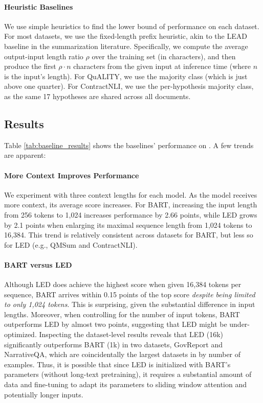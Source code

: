 \paragraph{Heuristic Baselines} We use simple heuristics to find the lower bound of performance on each dataset. For most datasets, we use the fixed-length prefix heuristic, akin to the LEAD baseline in the summarization literature. Specifically, we compute the average output-input length ratio $\rho$ over the training set (in characters), and then produce the first $\rho \cdot n$ characters from the given input at inference time (where $n$ is the input's length). For QuALITY, we use the majority class (which is just above one quarter). For ContractNLI, we use the per-hypothesis majority class, as the same 17 hypotheses are shared across all documents.

\subsection{Results}

Table \ref{tab:baseline_results} shows the baselines' performance on \scrolls{}.
A few trends are apparent:

\paragraph{More Context Improves Performance} We experiment with three context lengths for each model. As the model receives more context, its average \scrolls{} score increases. For BART, increasing the input length from 256 tokens to 1,024 increases performance by 2.66 points, while LED grows by 2.1 points when enlarging its maximal sequence length from 1,024 tokens to 16,384. This trend is relatively consistent across datasets for BART, but less so for LED (e.g., QMSum and ContractNLI).

\paragraph{BART versus LED} Although LED does achieve the highest \scrolls{} score when given 16,384 tokens per sequence, BART arrives within 0.15 points of the top score \textit{despite being limited to only 1,024 tokens}. This is surprising, given the substantial difference in input lengths. Moreover, when controlling for the number of input tokens, BART outperforms LED by almost two points, suggesting that LED might be under-optimized. Inspecting the dataset-level results reveals that LED (16k) significantly outperforms BART (1k) in two datasets, GovReport and NarrativeQA, which are coincidentally the largest datasets in \scrolls{} by number of examples. Thus, it is possible that since LED is initialized with BART's parameters (without long-text pretraining), it requires a substantial amount of data and fine-tuning to adapt its parameters to sliding window attention and potentially longer inputs.

